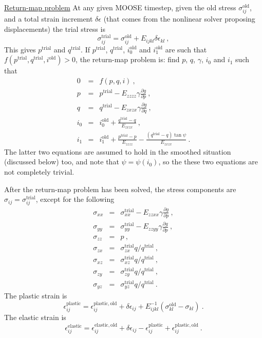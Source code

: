 \documentclass[]{scrreprt}
\newcommand{\ep}{\epsilon}
\begin{document}
\underline{Return-map problem} At any given MOOSE timestep, given the
old stress $\sigma_{ij}^{\mathrm{old}}$, and a total strain increment
$\delta \epsilon$ (that comes from the nonlinear solver proposing
displacements) the trial stress is
\begin{equation}
\sigma_{ij}^{\mathrm{trial}} = \sigma_{ij}^{\mathrm{old}} +
E_{ijkl}\delta\epsilon_{kl} \ ,
\end{equation}
This gives $p^{\mathrm{trial}}$ and $q^{\mathrm{trial}}$.  If
$p^{\mathrm{trial}}$, $q^{\mathrm{trial}}$, $i_{0}^{\mathrm{old}}$ and
$i_{1}^{\mathrm{old}}$ are such that $f(p^{\mathrm{trial}}, q^{\mathrm{trial}},
i^{\mathrm{old}}) > 0$, the return-map problem is: find $p$, $q$,
$\gamma$, $i_{0}$ and $i_{1}$ such that
\begin{eqnarray}
0 & = & f(p, q, i) \ , \nonumber \\
p & = & p^{\mathrm{trial}} - E_{zzzz}\gamma \frac{\partial g}{\partial
  p} \ , \nonumber \\
q & = & q^{\mathrm{trial}} - E_{zxzx}\gamma \frac{\partial g}{\partial
  q} \ , \nonumber \\
i_{0} & = & i_{0}^{\mathrm{old}} + \frac{q^{\mathrm{trial}} -
  q}{E_{zxzx}} \ , \nonumber \\
i_{1} & = & i_{1}^{\mathrm{old}} + \frac{p^{\mathrm{trial}} -
  p}{E_{zzzz}} - \frac{(q^{\mathrm{trial}} - q)\tan\psi}{E_{zxzx}} \ .
\label{rmp.eqn}
\end{eqnarray}
The latter two equations are assumed to hold in the smoothed situation
(discussed below) too, and note that $\psi = \psi(i_{0})$, so the
these two equations are not completely trivial.

After the return-map problem has been solved, the stress components
are $\sigma_{ij} = \sigma_{ij}^{\mathrm{trial}}$, except for the following
\begin{eqnarray}
\sigma_{xx} & = & \sigma_{xx}^{\mathrm{trial}} -
E_{zzxx}\gamma\frac{\partial g}{\partial p} \ , \\
\sigma_{yy} & = & \sigma_{yy}^{\mathrm{trial}} -
E_{zzyy}\gamma\frac{\partial g}{\partial p} \ , \\
\sigma_{zz} & = & p \ , \\
\sigma_{zx} & = & \sigma_{zx}^{\mathrm{trial}} q / q^{\mathrm{trial}}
\ , \\
\sigma_{xz} & = & \sigma_{xz}^{\mathrm{trial}} q / q^{\mathrm{trial}}
\ , \\
\sigma_{zy} & = & \sigma_{zy}^{\mathrm{trial}} q / q^{\mathrm{trial}}
\ , \\
\sigma_{yz} & = & \sigma_{yz}^{\mathrm{trial}} q / q^{\mathrm{trial}}
\ .
\end{eqnarray}
The plastic strain is
\begin{equation}
\ep_{ij}^{\mathrm{plastic}} = \ep_{ij}^{\mathrm{plastic, old}} +
\delta\epsilon_{ij} + E_{ijkl}^{-1}(\sigma_{kl}^{\mathrm{old}} -
\sigma_{kl}) \ .
\end{equation}
The elastic strain is
\begin{equation}
\ep_{ij}^{\mathrm{elastic}} = \ep_{ij}^{\mathrm{elastic, old}} +
\delta\epsilon_{ij} - \ep_{ij}^{\mathrm{plastic}} +
\ep_{ij}^{\mathrm{plastic, old}} \ .
\end{equation}
\end{document}
